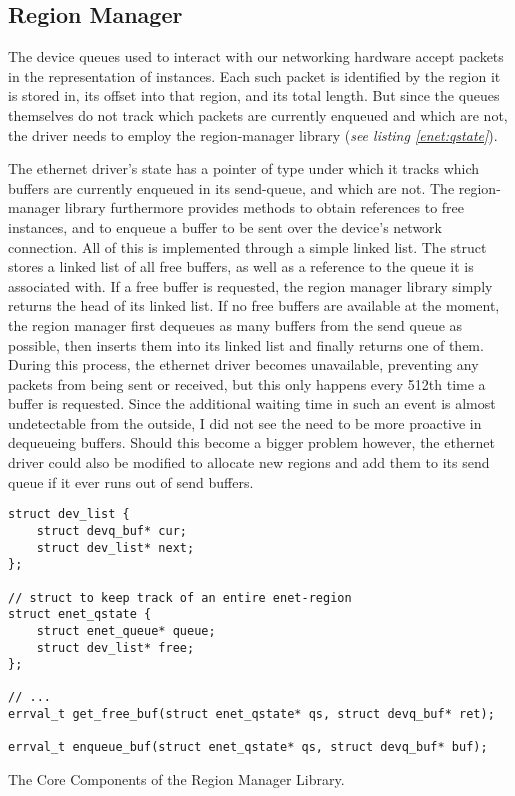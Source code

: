 \subsection{Region Manager}
The device queues used to interact with our networking hardware accept packets in the representation of  instances. Each such packet is identified by the region it is stored in, its offset into that region, and its total length. But since the queues themselves do not track which packets are currently enqueued and which are not, the driver needs to employ the region-manager library (\emph{see listing \ref{enet:qstate}}).

The ethernet driver's state has a pointer of type  under which it tracks which buffers are currently enqueued in its send-queue, and which are not. The region-manager library furthermore provides methods to obtain references to free  instances, and to enqueue a buffer to be sent over the device's network connection. All of this is implemented through a simple linked list. The  struct stores a linked list of all free buffers, as well as a reference to the queue it is associated with. If a free buffer is requested, the region manager library simply returns the head of its linked list. If no free buffers are available at the moment, the region manager first dequeues as many buffers from the send queue as possible, then inserts them into its linked list and finally returns one of them. During this process, the ethernet driver becomes unavailable, preventing any packets from being sent or received, but this only happens every 512th time a buffer is requested. Since the additional waiting time in such an event is almost undetectable from the outside, I did not see the need to be more proactive in dequeueing buffers. Should this become a bigger problem however, the ethernet driver could also be modified to allocate new regions and add them to its send queue if it ever runs out of send buffers.

\begin{code}
\begin{mdframed}[style=myframe]
\begin{verbatim}
struct dev_list {
    struct devq_buf* cur;
    struct dev_list* next;
};

// struct to keep track of an entire enet-region
struct enet_qstate {
    struct enet_queue* queue;
    struct dev_list* free;
};

// ...
errval_t get_free_buf(struct enet_qstate* qs, struct devq_buf* ret);

errval_t enqueue_buf(struct enet_qstate* qs, struct devq_buf* buf);
\end{verbatim}
\end{mdframed}
\caption{The Core Components of the Region Manager Library.}
\end{code}
\label{enet:qstate}

